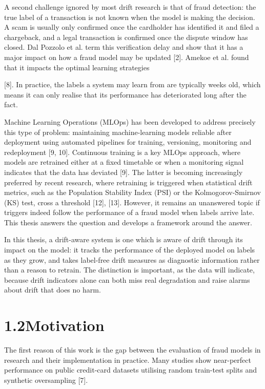 \documentclass[11pt,letterpaper]{report}
\begin{document}
A second challenge ignored by most drift research is that of fraud detection: the true label of a transaction is not known when the model is making the decision. A scam is usually only confirmed once the cardholder has identified it and filed a chargeback, and a legal transaction is confirmed once the dispute window has closed. Dal Pozzolo et al. term this verification delay and show that it has a major impact on how a fraud model may be updated [2]. Amekoe et al. found that it impacts the optimal learning strategies

[8]. In practice, the labels a system may learn from are typically weeks old, which means it can only realise that its performance has deteriorated long after the fact.

Machine Learning Operations (MLOps) has been developed to address precisely this type of problem: maintaining machine-learning models reliable after deployment using automated pipelines for training, versioning, monitoring and redeployment [9, 10]. Continuous training is a key MLOps approach, where models are retrained either at a fixed timetable or when a monitoring signal indicates that the data has deviated [9]. The latter is becoming increasingly preferred by recent research, where retraining is triggered when statistical drift metrics, such as the Population Stability Index (PSI) or the Kolmogorov-Smirnov (KS) test, cross a threshold [12], [13]. However, it remains an unanswered topic if triggers indeed follow the performance of a fraud model when labels arrive late. This thesis answers the question and develops a framework around the answer.

In this thesis, a drift-aware system is one which is aware of drift through its impact on the model: it tracks the performance of the deployed model on labels as they grow, and takes label-free drift measures as diagnostic information rather than a reason to retrain. The distinction is important, as the data will indicate, because drift indicators alone can both miss real degradation and raise alarms about drift that does no harm.

\section*{1.2\quad Motivation}

The first reason of this work is the gap between the evaluation of fraud models in research and their implementation in practice. Many studies show near-perfect performance on public credit-card datasets utilising random train-test splits and synthetic oversampling [7].
\end{document}
